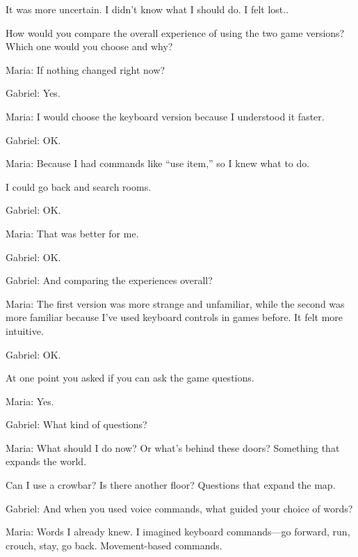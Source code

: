 \begin{QandA}
         \begin{answered}
            It was more uncertain.
            I didn’t know what I should do.
            I felt lost..
         \end{answered}
    \item How would you compare the overall experience of using the two game versions? Which one would you choose and why?

         \begin{answered}
            Maria: If nothing changed right now?

            Gabriel: Yes.

            Maria: I would choose the keyboard version because I understood it faster.

            Gabriel: OK.

            Maria: Because I had commands like “use item,” so I knew what to do.

            I could go back and search rooms.

            Gabriel: OK.

            Maria: That was better for me.

            Gabriel: OK.

            Gabriel: And comparing the experiences overall?

            Maria: The first version was more strange and unfamiliar, while the second was more familiar because I’ve used keyboard controls in games before.
            It felt more intuitive.

            Gabriel: OK.

            At one point you asked if you can ask the game questions.

            Maria: Yes.

            Gabriel: What kind of questions?

            Maria: What should I do now?
            Or what’s behind these doors?
            Something that expands the world.

            Can I use a crowbar?
            Is there another floor?
            Questions that expand the map.

            Gabriel: And when you used voice commands, what guided your choice of words?

            Maria: Words I already knew.
            I imagined keyboard commands—go forward, run, crouch, stay, go back.
            Movement-based commands.
            
         \end{answered}
\end{QandA}






